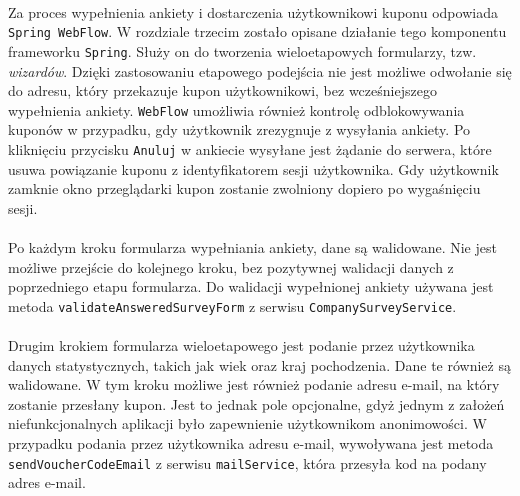\paragraph{}
Za proces wypełnienia ankiety i dostarczenia użytkownikowi kuponu odpowiada \texttt{Spring WebFlow}. W rozdziale trzecim zostało opisane działanie tego komponentu frameworku \texttt{Spring}. Służy on do tworzenia wieloetapowych formularzy, tzw. \textit{wizardów}. Dzięki zastosowaniu etapowego podejścia nie jest możliwe odwołanie się do adresu, który przekazuje kupon użytkownikowi, bez wcześniejszego wypełnienia ankiety. \texttt{WebFlow} umożliwia również kontrolę odblokowywania kuponów w przypadku, gdy użytkownik zrezygnuje z wysyłania ankiety. Po kliknięciu przycisku \texttt{Anuluj} w ankiecie wysyłane jest żądanie do serwera, które usuwa powiązanie kuponu z identyfikatorem sesji użytkownika. Gdy użytkownik zamknie okno przeglądarki kupon zostanie zwolniony dopiero po wygaśnięciu sesji.

\paragraph{}
Po każdym kroku formularza wypełniania ankiety, dane są walidowane. Nie jest możliwe przejście do kolejnego kroku, bez pozytywnej walidacji danych z poprzedniego etapu formularza. Do walidacji wypełnionej ankiety używana jest metoda \texttt{validate\-Answered\-Survey\-Form} z serwisu \texttt{Company\-Survey\-Service}.

\paragraph{}
Drugim krokiem formularza wieloetapowego jest podanie przez użytkownika danych statystycznych, takich jak wiek oraz kraj pochodzenia. Dane te również są walidowane. W tym kroku możliwe jest również podanie adresu e-mail, na który zostanie przesłany kupon. Jest to jednak pole opcjonalne, gdyż jednym z założeń niefunkcjonalnych aplikacji było zapewnienie użytkownikom anonimowości. W przypadku podania przez użytkownika adresu e-mail, wywoływana jest metoda \texttt{sendVoucherCodeEmail} z serwisu \texttt{mailService}, która przesyła kod na podany adres e-mail.

